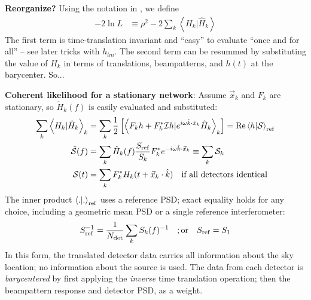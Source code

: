 \documentclass[twocolumn,prd,nofootinbib]{revtex4}
\newcommand\editremark[1]{{\color{red} #1}}
\newcommand\qmstateproduct[2]{\left\langle#1|#2\right\rangle}
\begin{document}
\begin{widetext}
\begin{shaded}
\noindent \textbf{Reorganize?}
Using the notation in  \citet{gwastro-mergers-HeeSuk-CompareToPE-Aligned}, we define 
\begin{eqnarray}
-2 \ln L &\equiv \rho^2 - 2 \sum_k \qmstateproduct{H_k}{\hat{H}_k}
\end{eqnarray}
The first term is time-translation invariant and ``easy'' to evaluate ``once and for all'' -- see later tricks with
$h_{lm}$.   The second term can be resummed by substituting the value of $H_k$ in terms of translations, beampatterns,
and $h(t)$ at the barycenter.  So...


\noindent \textbf{Coherent likelihood for a stationary network}: Assume $\vec{x}_k$ and $F_k$ are  stationary, so
$\tilde{H}_k(f)$ is easily evaluated and substituted: 
\begin{align}
\label{eq:def:BarycenteredInnerProductWithData}
\sum_k \qmstateproduct{H_k}{\hat{H}_k}_k 
& = 
 \sum_k \frac{1}{2}\left [ \qmstateproduct{ F_k h +  F_k^*{\cal I}h}{e^{i\omega \hat{k}\cdot \hat{x}_k} \hat{H}_k}_k
 \right]
= \text{Re} \qmstateproduct{h}{{\cal S}}_{\rm ref} \\
\tilde{{\cal S}}(f) &= \sum_k \hat{H}_k(f) \frac{S_{\rm ref}}{S_{k}} F_k^* e^{-i\omega \hat{k}\cdot \vec{x}_k} \equiv \sum_k {\cal S}_k\\
{\cal S}(t) &= \sum_k F_k^* H_k(t+\vec{x}_k\cdot \hat{k}) \quad \text{if all detectors identical}
\end{align}
The inner product $\qmstateproduct{.}{.}_{\rm ref}$ uses a reference PSD; exact equality holds for any choice, including
a geometric mean PSD or a single reference interferometer:
\begin{eqnarray}
S_{\rm ref}^{-1} = \frac{1}{N_{\rm det}} \sum_k S_{k}(f)^{-1} \quad ;\text{or} \quad  S_{\rm ref} = S_1
\end{eqnarray}
%
In this form, the translated detector data carries all information about the sky location; no information about the
source is used.  The data from each detector is \emph{barycentered} by first applying the \emph{inverse} time
translation operation; then the beampattern response and detector PSD, as a weight.
%


\end{shaded}
\end{widetext}
\end{document}
